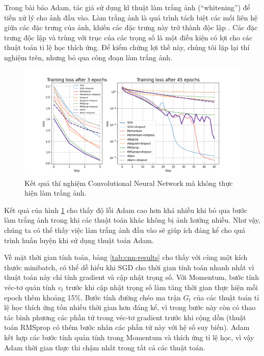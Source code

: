 Trong bài báo Adam, tác giả sử dụng kĩ thuật làm trắng ảnh (``whitening'') để tiền xử lý cho ảnh đầu vào. Làm trắng ảnh là quá trình tách biệt các mối liên hệ giữa các đặc trưng của ảnh, khiến các đặc trưng này trở thành độc lập \cite{kessey2015optimal}. Các đặc trưng độc lập và trùng với trục của các trọng số là một điều kiện có lợi cho các thuật toán tỉ lệ học thích ứng. Để kiểm chứng lợi thế này, chúng tôi lặp lại thí nghiệm trên, nhưng bỏ qua công đoạn làm trắng ảnh.

\begin{figure}[H]
	\centering
	\includegraphics[width=140 mm]{images/cnn-nonwhitened.png}
	\caption{Kết quả thí nghiệm Convolutional Neural Network mà không thực hiện làm trắng ảnh.}
	\label{fig:exp-cnn-nonw}
\end{figure}

Kết quả của hình \ref{fig:exp-cnn-nonw} cho thấy độ lỗi Adam cao hơn khá nhiều khi bỏ qua bước làm trắng ảnh trong khi các thuật toán khác không bị ảnh hưởng nhiều. Như vậy, chúng ta có thể thấy việc làm trắng ảnh đầu vào sẽ giúp ích đáng kể cho quá trình huấn luyện khi sử dụng thuật toán Adam.

Về mặt thời gian tính toán, bảng \ref{tab:cnn-results} cho thấy với cùng một kích thước minibatch, có thể dễ hiểu khi SGD cho thời gian tính toán nhanh nhất vì thuật toán này chỉ tính gradient và cập nhật trọng số. Với Momentum, bước tính véc-tơ quán tính $v_t$ trước khi cập nhật trọng số làm tăng thời gian thực hiện mỗi epoch thêm khoảng 15$\%$. Bước tính đường chéo ma trận $G_t$ của các thuật toán tỉ lệ học thích ứng tốn nhiều thời gian hơn đáng kể, vì trong bước này còn có thao tác bình phương các phần tử trong véc-tơ gradient trước khi cộng dồn (thuật toán RMSprop có thêm bước nhân các phần tử này với hệ số suy biến). Adam kết hợp các bước tính quán tính trong Momentum và thích ứng tỉ lệ học, vì vậy Adam thời gian thực thi chậm nhất trong tất cả các thuật toán.

